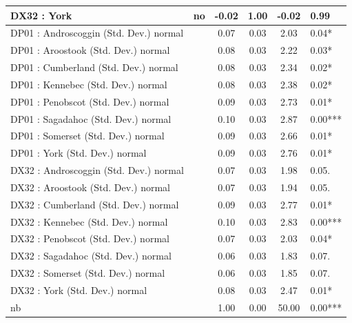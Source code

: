 \begin{table}
\begin{center}
\begin{tabular}{|l|l|c|c|c|l|}
			\hline
			DX32 : York & no & -0.02 & 1.00 & -0.02 & 0.99 \\
			\hline
			DP01 : Androscoggin (Std. Dev.) normal &  & 0.07 & 0.03 & 2.03 & 0.04* \\
			\hline
			DP01 : Aroostook (Std. Dev.) normal &  & 0.08 & 0.03 & 2.22 & 0.03* \\
			\hline
			DP01 : Cumberland (Std. Dev.) normal &  & 0.08 & 0.03 & 2.34 & 0.02* \\
			\hline
			DP01 : Kennebec (Std. Dev.) normal &  & 0.08 & 0.03 & 2.38 & 0.02* \\
			\hline
			DP01 : Penobscot (Std. Dev.) normal &  & 0.09 & 0.03 & 2.73 & 0.01* \\
			\hline
			DP01 : Sagadahoc (Std. Dev.) normal &  & 0.10 & 0.03 & 2.87 & 0.00*** \\
			\hline
			DP01 : Somerset (Std. Dev.) normal &  & 0.09 & 0.03 & 2.66 & 0.01* \\
			\hline
			DP01 : York (Std. Dev.) normal &  & 0.09 & 0.03 & 2.76 & 0.01* \\
			\hline
			DX32 : Androscoggin (Std. Dev.) normal &  & 0.07 & 0.03 & 1.98 & 0.05. \\
			\hline
			DX32 : Aroostook (Std. Dev.) normal &  & 0.07 & 0.03 & 1.94 & 0.05. \\
			\hline
			DX32 : Cumberland (Std. Dev.) normal &  & 0.09 & 0.03 & 2.77 & 0.01* \\
			\hline
			DX32 : Kennebec (Std. Dev.) normal &  & 0.10 & 0.03 & 2.83 & 0.00*** \\
			\hline
			DX32 : Penobscot (Std. Dev.) normal &  & 0.07 & 0.03 & 2.03 & 0.04* \\
			\hline
			DX32 : Sagadahoc (Std. Dev.) normal &  & 0.06 & 0.03 & 1.83 & 0.07. \\
			\hline
			DX32 : Somerset (Std. Dev.) normal &  & 0.06 & 0.03 & 1.85 & 0.07. \\
			\hline
			DX32 : York (Std. Dev.) normal &  & 0.08 & 0.03 & 2.47 & 0.01* \\
			\hline
			nb &  & 1.00 & 0.00 & 50.00 & 0.00*** \\
			\hline
		\end{tabular}
	\end{center}
\end{table}